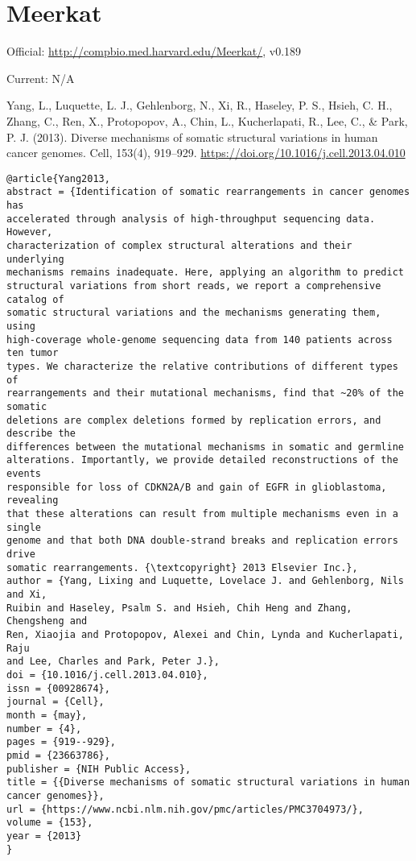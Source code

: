 \documentclass[]{article}
\begin{document}
\section{Meerkat}

Official: \url{http://compbio.med.harvard.edu/Meerkat/}, v0.189

Current: N/A

Yang, L., Luquette, L. J., Gehlenborg, N., Xi, R., Haseley, P. S., Hsieh, C. H., Zhang, C., Ren, X., Protopopov, A., Chin, L., Kucherlapati, R., Lee, C., \& Park, P. J. (2013). Diverse mechanisms of somatic structural variations in human cancer genomes. Cell, 153(4), 919–929. \url{https://doi.org/10.1016/j.cell.2013.04.010}

\begin{verbatim}
@article{Yang2013,
abstract = {Identification of somatic rearrangements in cancer genomes has
accelerated through analysis of high-throughput sequencing data. However,
characterization of complex structural alterations and their underlying
mechanisms remains inadequate. Here, applying an algorithm to predict
structural variations from short reads, we report a comprehensive catalog of
somatic structural variations and the mechanisms generating them, using
high-coverage whole-genome sequencing data from 140 patients across ten tumor
types. We characterize the relative contributions of different types of
rearrangements and their mutational mechanisms, find that ~20% of the somatic
deletions are complex deletions formed by replication errors, and describe the
differences between the mutational mechanisms in somatic and germline
alterations. Importantly, we provide detailed reconstructions of the events
responsible for loss of CDKN2A/B and gain of EGFR in glioblastoma, revealing
that these alterations can result from multiple mechanisms even in a single
genome and that both DNA double-strand breaks and replication errors drive
somatic rearrangements. {\textcopyright} 2013 Elsevier Inc.},
author = {Yang, Lixing and Luquette, Lovelace J. and Gehlenborg, Nils and Xi,
Ruibin and Haseley, Psalm S. and Hsieh, Chih Heng and Zhang, Chengsheng and
Ren, Xiaojia and Protopopov, Alexei and Chin, Lynda and Kucherlapati, Raju
and Lee, Charles and Park, Peter J.},
doi = {10.1016/j.cell.2013.04.010},
issn = {00928674},
journal = {Cell},
month = {may},
number = {4},
pages = {919--929},
pmid = {23663786},
publisher = {NIH Public Access},
title = {{Diverse mechanisms of somatic structural variations in human
cancer genomes}},
url = {https://www.ncbi.nlm.nih.gov/pmc/articles/PMC3704973/},
volume = {153},
year = {2013}
}
\end{verbatim}
\end{document}

